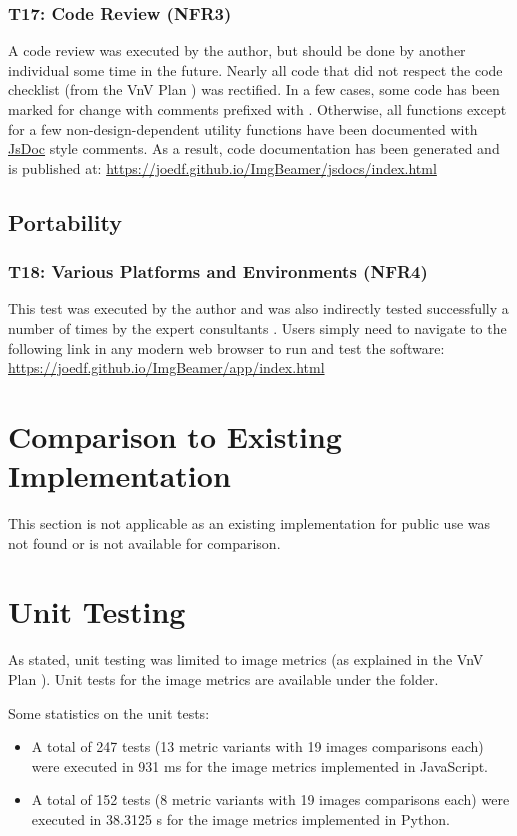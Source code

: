 \documentclass[12pt, titlepage]{article}
\begin{document}
\subsubsection{T17: Code Review (NFR3)}
A code review was executed by the author, but should be done by another individual some time in the future.
Nearly all code that did not respect the code checklist (from the VnV Plan \cite{VnV_plan})
was rectified. In a few cases, some code has been marked for change with comments prefixed with
. Otherwise, all functions except for a few non-design-dependent utility functions
have been documented with \href{https://github.com/jsdoc/jsdoc}{JsDoc} style comments.
As a result, code documentation has been generated and is published at:
\url{https://joedf.github.io/ImgBeamer/jsdocs/index.html}

\subsection{Portability}
\subsubsection{T18: Various Platforms and Environments (NFR4)}
This test was executed by the author and was also indirectly tested successfully a number of times
by the expert consultants \cite{VnV_plan}. Users simply need to navigate to the following link
in any modern web browser to run and test the software:
\url{https://joedf.github.io/ImgBeamer/app/index.html}
	
\section{Comparison to Existing Implementation}	

This section is not applicable as an existing implementation for public use was not found or
is not available for comparison.

\section{Unit Testing}
As stated, unit testing was limited to image metrics (as explained in the VnV Plan \cite{VnV_plan}).
Unit tests for the image metrics are available under the  folder.

Some statistics on the unit tests:
\begin{itemize}
  \item A total of 247 tests (13 metric variants with 19 images comparisons each) were
    executed in 931 \si{ms} for the image metrics implemented in JavaScript.
  \item A total of 152 tests (8 metric variants with 19 images comparisons each) were
    executed in 38.3125 \si{s} for the image metrics implemented in Python.
\end{itemize}
\end{document}
